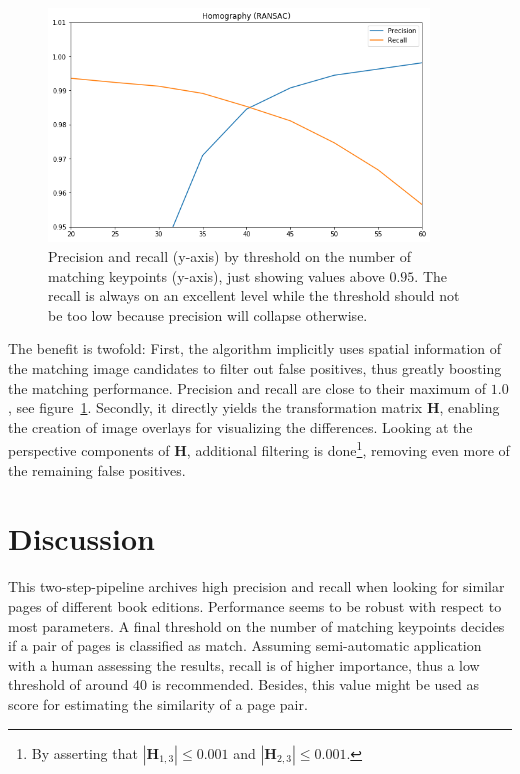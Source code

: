 \documentclass{ltjarticle}
\begin{document}
\begin{figure}[p]
    \centering
    \includegraphics[width=0.9\textwidth]{ransac-performance.png}
    \caption[RANSAC performance]{Precision and recall (y-axis) by threshold on the number of matching keypoints (y-axis), just showing values above $0.95$. The recall is always on an excellent level while the threshold should not be too low because precision will collapse otherwise.}
    \label{fig:ransac}
\end{figure}

The benefit is twofold: First, the algorithm implicitly uses spatial information of the matching image candidates to filter out false positives, thus greatly boosting the matching performance. Precision and recall are close to their maximum of $1.0$, see figure~\ref{fig:ransac}. Secondly, it directly yields the transformation matrix $\mathbf{H}$, enabling the creation of image overlays for visualizing the differences. Looking at the perspective components of $\mathbf{H}$, additional filtering is done\footnote{By asserting that $|\mathbf{H}_{1,3}| \leq 0.001$ and $|\mathbf{H}_{2,3}| \leq 0.001$.}, removing even more of the remaining false positives.

\section{Discussion}

This two-step-pipeline archives high precision and recall when looking for similar pages of different book editions. Performance seems to be robust with respect to most parameters. A final threshold on the number of matching keypoints decides if a pair of pages is classified as match. Assuming semi-automatic application with a human assessing the results, recall is of higher importance, thus a low threshold of around $40$ is recommended. Besides, this value might be used as score for estimating the similarity of a page pair.
\end{document}

